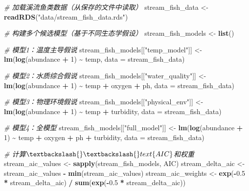 \documentclass[
  twoside,12pt,fontset=none]{ctexbook}
\newenvironment{Shaded}{\begin{snugshade}}{\end{snugshade}}
\newcommand{\AttributeTok}[1]{\textcolor[rgb]{0.13,0.29,0.53}{#1}}
\newcommand{\CommentTok}[1]{\textcolor[rgb]{0.56,0.35,0.01}{\textit{#1}}}
\newcommand{\DecValTok}[1]{\textcolor[rgb]{0.00,0.00,0.81}{#1}}
\newcommand{\FloatTok}[1]{\textcolor[rgb]{0.00,0.00,0.81}{#1}}
\newcommand{\FunctionTok}[1]{\textcolor[rgb]{0.13,0.29,0.53}{\textbf{#1}}}
\newcommand{\NormalTok}[1]{#1}
\newcommand{\OtherTok}[1]{\textcolor[rgb]{0.56,0.35,0.01}{#1}}
\newcommand{\SpecialCharTok}[1]{\textcolor[rgb]{0.81,0.36,0.00}{\textbf{#1}}}
\newcommand{\StringTok}[1]{\textcolor[rgb]{0.31,0.60,0.02}{#1}}
\begin{document}
\begin{Shaded}
\begin{Highlighting}[]
\CommentTok{\# 加载溪流鱼类数据（从保存的文件中读取）}
\NormalTok{stream\_fish\_data }\OtherTok{\textless{}{-}} \FunctionTok{readRDS}\NormalTok{(}\StringTok{"data/stream\_fish\_data.rds"}\NormalTok{)}

\CommentTok{\# 构建多个候选模型（基于不同生态学假设）}
\NormalTok{stream\_fish\_models }\OtherTok{\textless{}{-}} \FunctionTok{list}\NormalTok{()}

\CommentTok{\# 模型1：温度主导假说}
\NormalTok{stream\_fish\_models[[}\StringTok{"temp\_model"}\NormalTok{]] }\OtherTok{\textless{}{-}} \FunctionTok{lm}\NormalTok{(}\FunctionTok{log}\NormalTok{(abundance }\SpecialCharTok{+} \DecValTok{1}\NormalTok{) }\SpecialCharTok{\textasciitilde{}}\NormalTok{ temp, }\AttributeTok{data =}\NormalTok{ stream\_fish\_data)}

\CommentTok{\# 模型2：水质综合假说}
\NormalTok{stream\_fish\_models[[}\StringTok{"water\_quality"}\NormalTok{]] }\OtherTok{\textless{}{-}}
  \FunctionTok{lm}\NormalTok{(}\FunctionTok{log}\NormalTok{(abundance }\SpecialCharTok{+} \DecValTok{1}\NormalTok{) }\SpecialCharTok{\textasciitilde{}}\NormalTok{ temp }\SpecialCharTok{+}\NormalTok{ oxygen }\SpecialCharTok{+}\NormalTok{ ph, }\AttributeTok{data =}\NormalTok{ stream\_fish\_data)}

\CommentTok{\# 模型3：物理环境假说}
\NormalTok{stream\_fish\_models[[}\StringTok{"physical\_env"}\NormalTok{]] }\OtherTok{\textless{}{-}} \FunctionTok{lm}\NormalTok{(}\FunctionTok{log}\NormalTok{(abundance }\SpecialCharTok{+} \DecValTok{1}\NormalTok{) }\SpecialCharTok{\textasciitilde{}}\NormalTok{ temp }\SpecialCharTok{+}\NormalTok{ turbidity, }\AttributeTok{data =}\NormalTok{ stream\_fish\_data)}

\CommentTok{\# 模型4：全模型}
\NormalTok{stream\_fish\_models[[}\StringTok{"full\_model"}\NormalTok{]] }\OtherTok{\textless{}{-}}
  \FunctionTok{lm}\NormalTok{(}\FunctionTok{log}\NormalTok{(abundance }\SpecialCharTok{+} \DecValTok{1}\NormalTok{) }\SpecialCharTok{\textasciitilde{}}\NormalTok{ temp }\SpecialCharTok{+}\NormalTok{ oxygen }\SpecialCharTok{+}\NormalTok{ ph }\SpecialCharTok{+}\NormalTok{ turbidity, }\AttributeTok{data =}\NormalTok{ stream\_fish\_data)}

\CommentTok{\# 计算$\textbackslash{}\textbackslash{}text\{AIC\}$和权重}
\NormalTok{stream\_aic\_values }\OtherTok{\textless{}{-}} \FunctionTok{sapply}\NormalTok{(stream\_fish\_models, AIC)}
\NormalTok{stream\_delta\_aic }\OtherTok{\textless{}{-}}\NormalTok{ stream\_aic\_values }\SpecialCharTok{{-}} \FunctionTok{min}\NormalTok{(stream\_aic\_values)}
\NormalTok{stream\_aic\_weights }\OtherTok{\textless{}{-}} \FunctionTok{exp}\NormalTok{(}\SpecialCharTok{{-}}\FloatTok{0.5} \SpecialCharTok{*}\NormalTok{ stream\_delta\_aic) }\SpecialCharTok{/}
  \FunctionTok{sum}\NormalTok{(}\FunctionTok{exp}\NormalTok{(}\SpecialCharTok{{-}}\FloatTok{0.5} \SpecialCharTok{*}\NormalTok{ stream\_delta\_aic))}


\end{Highlighting}
\end{Shaded}
\end{document}
